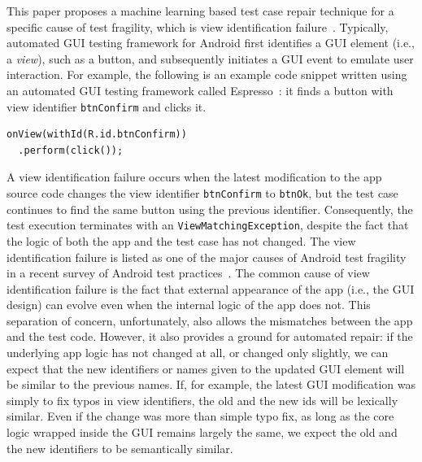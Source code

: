 \documentclass[sigconf]{acmart}
\newcommand{\fixme}[1]{{\color{red}{\textbf{FIXME:#1}}}}
\begin{document}
This paper proposes a machine learning based test case repair technique for a
specific cause of test fragility, which is view identification failure~\cite{Coppola2019fv}. Typically, automated GUI testing framework for Android first
identifies a GUI element (i.e., a \emph{view}), such as a button, and
subsequently initiates a GUI event to emulate user interaction. For example,
the following is an example code snippet written using an automated GUI
testing framework called Espresso~\cite{}: it finds a button with view
identifier \lstinline+btnConfirm+ and clicks it.

\begin{lstlisting}
onView(withId(R.id.btnConfirm))
  .perform(click());
\end{lstlisting}

A view identification failure occurs when the latest modification to the app
source code changes the view identifier \lstinline+btnConfirm+ to
\lstinline+btnOk+, but the test case continues to find the same button using
the previous identifier. Consequently, the test execution terminates with an
\texttt{ViewMatchingException}, despite the fact that the logic of both the app and the
test case has not changed. The view identification failure is listed as one of
the major causes of Android test fragility in a recent survey of
Android test practices~\cite{Coppola2019fv}.
The common cause of view identification failure is the fact that external
appearance of the app (i.e., the GUI design) can evolve even when the internal
logic of the app does not. This separation of concern, unfortunately, also
allows the mismatches between the app and the test code. However, it also
provides a ground for automated repair: if the underlying app logic has not
changed at all, or changed only slightly, we can expect that the new identifiers or
names given to the updated GUI element will be similar to the previous names.
If, for example, the latest GUI modification was simply to fix typos in view
identifiers, the old and the new ids will be lexically similar. Even if the
change was more than simple typo fix, as long as the core logic wrapped inside
the GUI remains largely the same, we expect the old and the new identifiers to
be semantically similar.
\end{document}
